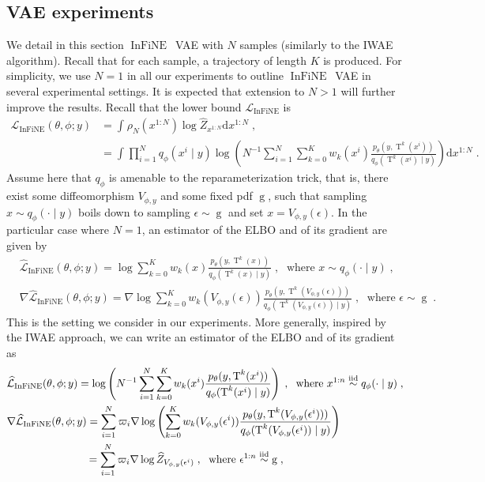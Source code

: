 \documentclass{article}
\def\elboneq{\mathcal{L}_{\IFIS}}
\def\simiid{\overset{\operatorname{iid}}{\sim}}
\def\IFIS{\ensuremath{\operatorname{InFiNE}}}
\def\InFiNE{{\small \IFIS}}
\def\transfo{\operatorname{T}}
\def\rmd{\operatorname{d}\hspace{-2pt}}
\def\rmd{\mathrm{d}}
\def\eqsp{\,}
\def\eqsp{\;}
\newcommand{\1}{\mathds{1}}
\def\varphibf{\operatorname{g}}
\def\proposal{\rho}
\newcommand{\chunku}[3]{#1^{#2:#3}}
\newcommand{\estConstC}[1]{\widehat{Z}_{#1}}
\def\rmd{\mathrm{d}}
\def\densgauss{\varphibf}
\begin{document}
\subsection{VAE experiments}
\label{supsec:vae_exps}
We detail in this section \InFiNE\ VAE with $N$ samples (similarly to the IWAE algorithm). Recall that for each sample,  a trajectory of length $K$ is produced. 
For simplicity, we use $N=1$ in all our experiments to outline \IFIS\ VAE in several experimental settings. It is expected that extension to $N > 1$ will further improve the results.
Recall that the  lower bound $\elboneq$ is 
\begin{align*}
    \elboneq(\theta, \phi; y) &= \int_{} \proposal_N( \chunku{x}{1}{N})   \log \estConstC{\chunku{x}{1}{N}} \rmd \chunku{x}{1}{N}\eqsp,\\
&= \int_{} \prod_{i=1}^N q_\phi(x^i\mid y)   \log\left( N^{-1}\sum_{i=1}^N\sum_{k=0}^K w_k(x^i) \frac{p_\theta(y, \transfo^k(x^i))}{q_\phi(\transfo^k(x^i)\mid y)}\right)\rmd \chunku{x}{1}{N}\eqsp.
\end{align*}
Assume here that $q_\phi$ is amenable to the reparameterization trick, that is, there exist some diffeomorphism $V_{\phi,y}$ and some fixed pdf $\densgauss$, such that sampling $x\sim q_\phi(\cdot\mid y)$ boils down to sampling $\epsilon\sim\densgauss$ and set $x = V_{\phi,y}(\epsilon)$.
In the particular case where $N=1$, an estimator of the ELBO and of its gradient are given by
\begin{align*}
    &\widehat{\mathcal{L}}_{\IFIS}(\theta, \phi; y) = \log \sum_{k=0}^K w_k(x) \frac{p_\theta(y, \transfo^k(x))}{q_\phi(\transfo^k(x)\mid y)}\eqsp, \eqsp \text{ where } x\sim q_\phi(\cdot\mid y)\eqsp,\\
    &\nabla \widehat{\mathcal{L}}_{\IFIS}(\theta, \phi; y) = \nabla\log \sum_{k=0}^K w_k(V_{\phi,y}(\epsilon)) \frac{p_\theta(y, \transfo^k(V_{\phi,y}(\epsilon)))}{q_\phi(\transfo^k(V_{\phi,y}(\epsilon))\mid y)}\eqsp, \eqsp \text{ where } \epsilon \sim \densgauss\eqsp.
\end{align*}
This is the setting we consider in our experiments. More generally, inspired by the IWAE approach, we can write an estimator of the ELBO and of its gradient as
\begin{align}
\label{eq:gradient_elboneq}
\nonumber
    &\widehat{\mathcal{L}}_{\IFIS} (\theta, \phi; y) = \log\left( N^{-1}\sum_{i=1}^N\sum_{k=0}^K w_k(x^i) \frac{p_\theta(y, \transfo^k(x^i))}{q_\phi(\transfo^k(x^i)\mid y)}\right)\eqsp, \eqsp \text{ where } \chunku{x}{1}{n}\simiid q_\phi(\cdot\mid y)\eqsp,\\
    &\nabla \widehat{\mathcal{L}}_{\IFIS} (\theta, \phi; y) = \sum_{i=1}^N \varpi_i \nabla\log\left( \sum_{k=0}^K w_k(V_{\phi,y}(\epsilon^i)) \frac{p_\theta(y, \transfo^k(V_{\phi,y}(\epsilon^i)))}{q_\phi(\transfo^k(V_{\phi,y}(\epsilon^i))\mid y)}\right)\\
&\hspace{2.6cm}=\sum_{i=1}^N \varpi_i \nabla\log\estConstC{V_{\phi,y}(\epsilon^i)} \eqsp, \eqsp \text{ where } \chunku{\epsilon}{1}{n} \simiid \densgauss\eqsp,
\end{align}
\end{document}
